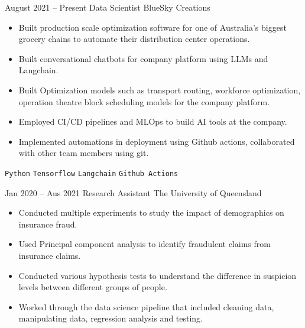 \documentclass[9pt]{developercv} %
\begin{document}
\vspace{-10 pt}
\begin{entrylist}
	\entry
        {August 2021 -- Present} %
		{Data Scientist}  %
		{BlueSky Creations}  %
		{\vspace{-10pt}
        \begin{itemize}[noitemsep,topsep=0pt,parsep=0pt,partopsep=0pt, leftmargin=-1pt]
            \item Built production scale optimization software for one of Australia's biggest grocery chains to automate their distribution center operations.
            \item Built conversational chatbots for company platform using LLMs and Langchain.
            \item Built Optimization models such as transport routing, workforce optimization, operation theatre block scheduling models for the company platform.
            \item Employed CI/CD pipelines and MLOps to build AI tools at the company.
            \item Implemented automations in deployment using Github actions, collaborated with other team members using git.
        \end{itemize} 
        \texttt{Python} \slashsep \texttt{Tensorflow} \slashsep \texttt{Langchain} \slashsep \texttt{Github Actions}} %
	\entry
		{Jan 2020 -- Aus 2021}
		{Research Assistant}
		{The University of Queensland}
		{\vspace{-10pt}
        \begin{itemize}[noitemsep,topsep=0pt,parsep=0pt,partopsep=0pt, leftmargin=-1pt]
            \item Conducted multiple experiments to study the impact of demographics on insurance fraud.
            \item Used Principal component analysis to identify fraudulent claims from insurance claims.
            \item Conducted various hypothesis tests to understand the difference in suspicion levels between different groups of people.
            \item Worked through the data science pipeline that included cleaning data, manipulating data, regression analysis and testing.

\end{itemize}}
\end{entrylist}
\end{document}
